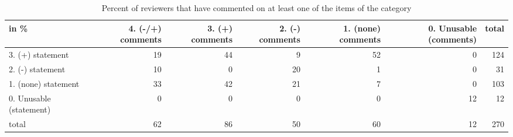 \documentclass{article}
\begin{document}
\begin{table}[H]

\centering

\begin{tabular}{lrrrrrr}
\hline
 in \%                    &   4. (-/+) comments &   3. (+) comments &   2. (-) comments &   1. (none) comments &   0. Unusable (comments) &   total \\
\hline
 3. (+) statement        &                  19 &                44 &                 9 &                   52 &                        0 &     124 \\
 2. (-) statement        &                  10 &                 0 &                20 &                    1 &                        0 &      31 \\
 1. (none) statement     &                  33 &                42 &                21 &                    7 &                        0 &     103 \\
 0. Unusable (statement) &                   0 &                 0 &                 0 &                    0 &                       12 &      12 \\
 total                   &                  62 &                86 &                50 &                   60 &                       12 &     270 \\
\hline
\end{tabular}\caption{Percent of reviewers that have commented on at least one of the items of the category}

\end{table}
\end{document}
